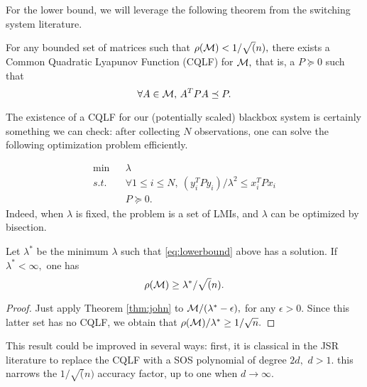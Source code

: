 For the lower bound, we will leverage the following theorem from the switching system literature.

\begin{theorem}\cite[Theorem 2.11]{jungers_lncis}\label{thm:john}
For any bounded set of matrices such that $\rho(\mathcal{M})<1/\sqrt(n),$ there exists a Common Quadratic Lyapunov Function (CQLF) for $\mathcal{M},$ that is, a $P\succeq 0$ such that $$\forall A\in \mathcal{M},\, A^TPA\preceq P. $$
\end{theorem}

The existence of a CQLF for our (potentially scaled) blackbox system is certainly something we can check: after collecting $N$ observations, one can solve the following optimization problem efficiently. 

\begin{eqnarray}
\nonumber \mbox{min}&&\lambda\\
 s.t.& & \label{eq:lowerbound} \forall 1\leq i \leq N,\ (y_i^T P y_i)/\lambda^2 \leq x_i^TPx_i\\
\nonumber && P \succeq 0.
\end{eqnarray}
Indeed, when $\lambda $ is fixed, the problem is a set of LMIs, and $\lambda $ can be optimized by bisection.

\begin{theorem}
Let $\lambda^*$ be the minimum $\lambda$ such that \eqref{eq:lowerbound} above has a solution.  If $\lambda^*<\infty,$ one has $$\rho(\mathcal{M}) \geq \lambda^*/\sqrt(n) .$$
\end{theorem}
\begin{proof}
Just apply Theorem \ref{thm:john} to $\mathcal{M} /(\lambda^*-\epsilon),$ for any $\epsilon>0.$ Since this latter set has no CQLF, we obtain that $\rho(\mathcal{M})/\lambda^*\geq 1/\sqrt{n}.$
\end{proof}
This result could be improved in several ways: first, it is classical in the JSR literature to replace the CQLF with a SOS polynomial of degree $2d,$ $d>1.$ this narrows the $1/\sqrt(n)$ accuracy factor, up to one when $d\rightarrow \infty.$  